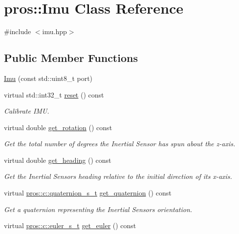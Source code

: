 \hypertarget{classpros_1_1Imu}{}\section{pros\+:\+:Imu Class Reference}
\label{classpros_1_1Imu}


{\ttfamily \#include $<$imu.\+hpp$>$}

\subsection*{Public Member Functions}
\begin{DoxyCompactItemize}
\item 
\hyperlink{classpros_1_1Imu_aac194322ec0563c1c73f540733e7cc4e}{Imu} (const std\+::uint8\+\_\+t port)
\item 
virtual std\+::int32\+\_\+t \hyperlink{classpros_1_1Imu_ad7973cfad5f8f83e7007342055197c43}{reset} () const
\begin{DoxyCompactList}\small\item\em Calibrate I\+MU. \end{DoxyCompactList}\item 
virtual double \hyperlink{classpros_1_1Imu_ac8bd7a19a6b4fc0c207a895efd3f0b48}{get\+\_\+rotation} () const
\begin{DoxyCompactList}\small\item\em Get the total number of degrees the Inertial Sensor has spun about the z-\/axis. \end{DoxyCompactList}\item 
virtual double \hyperlink{classpros_1_1Imu_a35c7953c5def3c034763af25c4dbebe3}{get\+\_\+heading} () const
\begin{DoxyCompactList}\small\item\em Get the Inertial Sensor\textquotesingle{}s heading relative to the initial direction of its x-\/axis. \end{DoxyCompactList}\item 
virtual \hyperlink{imu_8h_a1f3d4bf4251e6ce7cb374297de6390a1}{pros\+::c\+::quaternion\+\_\+s\+\_\+t} \hyperlink{classpros_1_1Imu_a3656b2476bb3ab8c2539615f76a0db39}{get\+\_\+quaternion} () const
\begin{DoxyCompactList}\small\item\em Get a quaternion representing the Inertial Sensor\textquotesingle{}s orientation. \end{DoxyCompactList}\item 
virtual \hyperlink{imu_8h_a93e80020ec907b7e11ac7166e5d01c55}{pros\+::c\+::euler\+\_\+s\+\_\+t} \hyperlink{classpros_1_1Imu_acd2f926bc97121518da774eefe6fc9e2}{get\+\_\+euler} () const

\end{DoxyCompactItemize}
